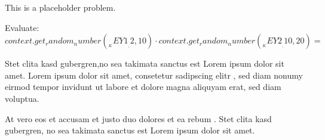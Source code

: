 This is a placeholder problem.
\begin{Problem}
\item Evaluate: ${{context.get_random_number(__KEY1__, 2, 10)}} \cdot {{context.get_random_number(__KEY2__, 10, 20)}} = $ 
\item Stet clita kasd gubergren,no sea takimata sanctus est Lorem ipsum dolor sit amet. Lorem ipsum dolor sit amet, consetetur sadipscing elitr , sed diam nonumy eirmod tempor invidunt ut labore et dolore magna aliquyam erat, sed diam voluptua. 
\item At vero eos et accusam et justo duo dolores et ea rebum . Stet clita kasd gubergren, no sea takimata sanctus est Lorem ipsum dolor sit amet. 
\end{Problem}
